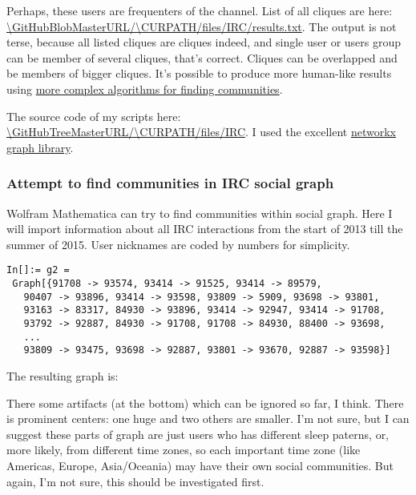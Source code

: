 Perhaps, these users are frequenters of the channel. List of all cliques are here:
\url{\GitHubBlobMasterURL/\CURPATH/files/IRC/results.txt}.
The output is not terse, because all listed cliques are cliques indeed, and single user or users group can be member of several cliques, that's correct.
Cliques can be overlapped and be members of bigger cliques.
It's possible to produce more human-like results using 
\href{https://en.wikipedia.org/wiki/Community_structure#Algorithms_for_finding_communities}{more complex algorithms for finding communities}.

The source code of my scripts here: \url{\GitHubTreeMasterURL/\CURPATH/files/IRC}.
I used the excellent \href{https://networkx.github.io/}{networkx graph library}.

\subsubsection{Attempt to find communities in IRC social graph}

Wolfram Mathematica can try to find communities within social graph.
Here I will import information about all IRC interactions from the start of 2013 till the summer of 2015.
User nicknames are coded by numbers for simplicity.

\begin{lstlisting}
In[]:= g2 = 
 Graph[{91708 -> 93574, 93414 -> 91525, 93414 -> 89579, 
   90407 -> 93896, 93414 -> 93598, 93809 -> 5909, 93698 -> 93801, 
   93163 -> 83317, 84930 -> 93896, 93414 -> 92947, 93414 -> 91708, 
   93792 -> 92887, 84930 -> 91708, 91708 -> 84930, 88400 -> 93698, 
   ...
   93809 -> 93475, 93698 -> 92887, 93801 -> 93670, 92887 -> 93598}]
\end{lstlisting}

The resulting graph is:

\begin{figure}[H]
\centering
{}
\end{figure}

There some artifacts (at the bottom) which can be ignored so far, I think.
There is prominent centers: one huge and two others are smaller.
I'm not sure, but I can suggest these parts of graph are just users who has different sleep paterns, or, more likely, from different time zones,
so each important time zone (like Americas, Europe, Asia/Oceania) may have their own social communities.
But again, I'm not sure, this should be investigated first.

